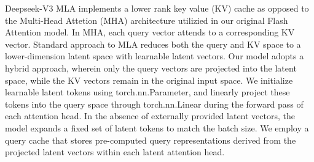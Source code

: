Deepseek-V3 MLA implements a lower rank key value (KV) cache as opposed to the Multi-Head Attetion (MHA) architecture utilizied in our original Flash Attention model. In MHA, each query vector attends to a corresponding KV vector\cite{liu2024deepseekv2}. Standard approach to MLA reduces both the query and KV space to a lower-dimension latent space with learnable latent vectors\cite{liu2024deepseekv2}. Our model adopts a hybrid approach, wherein only the query vectors are projected into the latent space, while the KV vectors remain in the original input space. We initialize learnable latent tokens using torch.nn.Parameter, and linearly project these tokens into the query space through torch.nn.Linear during the forward pass of each attention head. In the absence of externally provided latent vectors, the model expands a fixed set of latent tokens to match the batch size. We employ a query cache that stores pre-computed query representations derived from the projected latent vectors within each latent attention head.